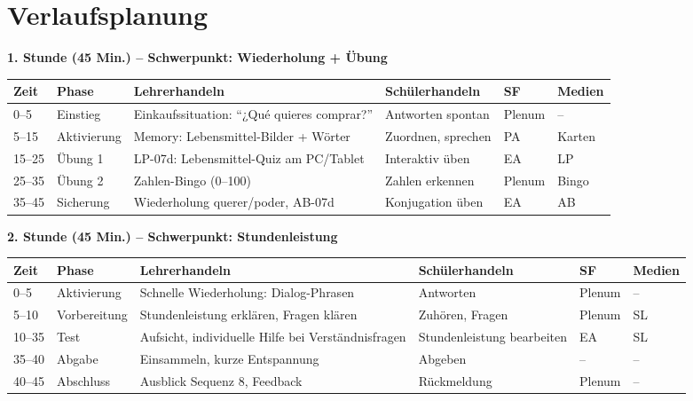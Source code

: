 \documentclass[11pt,a4paper]{article}
\begin{document}
\section{Verlaufsplanung}

\textbf{1. Stunde (45 Min.) -- Schwerpunkt: Wiederholung + Übung}

\begin{longtable}{|p{1cm}|p{1.5cm}|p{4cm}|p{3cm}|p{2cm}|p{2cm}|}
\hline
\textbf{Zeit} & \textbf{Phase} & \textbf{Lehrerhandeln} & \textbf{Schülerhandeln} & \textbf{SF} & \textbf{Medien} \\
\hline
\endhead

0--5 & Einstieg & Einkaufssituation: ``¿Qué quieres comprar?'' & Antworten spontan & Plenum & -- \\
\hline

5--15 & Aktivierung & Memory: Lebensmittel-Bilder + Wörter & Zuordnen, sprechen & PA & Karten \\
\hline

15--25 & Übung 1 & LP-07d: Lebensmittel-Quiz am PC/Tablet & Interaktiv üben & EA & LP \\
\hline

25--35 & Übung 2 & Zahlen-Bingo (0--100) & Zahlen erkennen & Plenum & Bingo \\
\hline

35--45 & Sicherung & Wiederholung querer/poder, AB-07d & Konjugation üben & EA & AB \\
\hline
\end{longtable}

\vspace{1em}

\textbf{2. Stunde (45 Min.) -- Schwerpunkt: Stundenleistung}

\begin{longtable}{|p{1cm}|p{1.5cm}|p{4cm}|p{3cm}|p{2cm}|p{2cm}|}
\hline
\textbf{Zeit} & \textbf{Phase} & \textbf{Lehrerhandeln} & \textbf{Schülerhandeln} & \textbf{SF} & \textbf{Medien} \\
\hline
\endhead

0--5 & Aktivierung & Schnelle Wiederholung: Dialog-Phrasen & Antworten & Plenum & -- \\
\hline

5--10 & Vorbereitung & Stundenleistung erklären, Fragen klären & Zuhören, Fragen & Plenum & SL \\
\hline

10--35 & Test & Aufsicht, individuelle Hilfe bei Verständnisfragen & Stundenleistung bearbeiten & EA & SL \\
\hline

35--40 & Abgabe & Einsammeln, kurze Entspannung & Abgeben & -- & -- \\
\hline

40--45 & Abschluss & Ausblick Sequenz 8, Feedback & Rückmeldung & Plenum & -- \\
\hline
\end{longtable}
\end{document}
